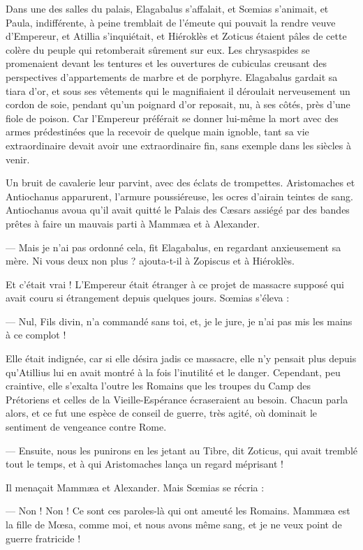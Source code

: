 \documentclass[a4paper, 11pt, oneside, polutonikogreek, french]{article}
\begin{document}
Dans une des salles du palais, Elagabalus s'affalait, et Sœmias s'animait, et Paula, indifférente, à peine tremblait de l'émeute qui pouvait la rendre veuve d'Empereur, et Atillia s'inquiétait, et Hiéroklès et Zoticus étaient pâles de cette colère du peuple qui retomberait sûrement sur eux. Les chrysaspides se promenaient devant les tentures et les ouvertures de cubiculas creusant des perspectives d'appartements de marbre et de porphyre. Elagabalus gardait sa tiara d'or, et sous ses vêtements qui le magnifiaient il déroulait nerveusement un cordon de soie, pendant qu'un poignard d'or reposait, nu, à ses côtés, près d'une fiole de poison. Car l'Empereur préférait se donner lui-même la mort avec des armes prédestinées que la recevoir de quelque main ignoble, tant sa vie extraordinaire devait avoir une extraordinaire fin, sans exemple dans les siècles à venir.

Un bruit de cavalerie leur parvint, avec des éclats de trompettes. Aristomaches et Antiochanus apparurent, l'armure poussiéreuse, les ocres d'airain teintes de sang. Antiochanus avoua qu'il avait quitté le Palais des Cæsars assiégé par des bandes prêtes à faire un mauvais parti à Mammæa et à Alexander.

--- Mais je n'ai pas ordonné cela, fit Elagabalus, en regardant anxieusement sa mère. Ni vous deux non plus ? ajouta-t-il à Zopiscus et à Hiéroklès.

Et c'était vrai ! L'Empereur était étranger à ce projet de massacre supposé qui avait couru si étrangement depuis quelques jours. Sœmias s'éleva :

--- Nul, Fils divin, n'a commandé sans toi, et, je le jure, je n'ai pas mis les mains à ce complot !

Elle était indignée, car si elle désira jadis ce massacre, elle n'y pensait plus depuis qu'Atillius lui en avait montré à la fois l'inutilité et le danger. Cependant, peu craintive, elle s'exalta l'outre les Romains que les troupes du Camp des Prétoriens et celles de la Vieille-Espérance écraseraient au besoin. Chacun parla alors, et ce fut une espèce de conseil de guerre, très agité, où dominait le sentiment de vengeance contre Rome.

--- Ensuite, nous les punirons en les jetant au Tibre, dit Zoticus, qui avait tremblé tout le temps, et à qui Aristomaches lança un regard méprisant !

Il menaçait Mammæa et Alexander. Mais Sœmias se récria :

--- Non ! Non ! Ce sont ces paroles-là qui ont ameuté les Romains. Mammæa est la fille de Mœsa, comme moi, et nous avons même sang, et je ne veux point de guerre fratricide !
\end{document}
